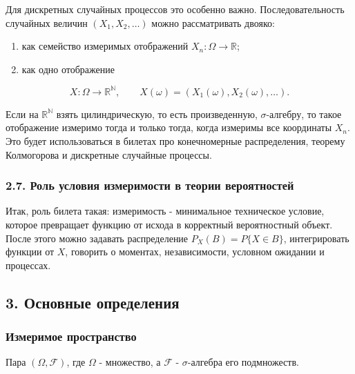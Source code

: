 \documentclass[
  11pt,
  a4paper,
]{article}
\providecommand{\tightlist}{%
  \setlength{\itemsep}{0pt}\setlength{\parskip}{0pt}}
\begin{document}
Для дискретных случайных процессов это особенно важно.
Последовательность случайных величин \((X_1,X_2,\ldots)\) можно
рассматривать двояко:

\begin{enumerate}
\def\labelenumi{\arabic{enumi}.}
\tightlist
\item
  как семейство измеримых отображений \(X_n:\Omega\to\mathbb R\);
\item
  как одно отображение
\end{enumerate}

\[
X:\Omega\to\mathbb R^{\mathbb N},\qquad
X(\omega)=(X_1(\omega),X_2(\omega),\ldots).
\]

Если на \(\mathbb R^{\mathbb N}\) взять цилиндрическую, то есть
произведенную, \(\sigma\)-алгебру, то такое отображение измеримо тогда и
только тогда, когда измеримы все координаты \(X_n\). Это будет
использоваться в билетах про конечномерные распределения, теорему
Колмогорова и дискретные случайные процессы.

\subsubsection{2.7. Роль условия измеримости в теории
вероятностей}\label{ux440ux43eux43bux44c-ux443ux441ux43bux43eux432ux438ux44f-ux438ux437ux43cux435ux440ux438ux43cux43eux441ux442ux438-ux432-ux442ux435ux43eux440ux438ux438-ux432ux435ux440ux43eux44fux442ux43dux43eux441ux442ux435ux439}

Итак, роль билета такая: измеримость - минимальное техническое условие,
которое превращает функцию от исхода в корректный вероятностный объект.
После этого можно задавать распределение \(P_X(B)=P\{X\in B\}\),
интегрировать функции от \(X\), говорить о моментах, независимости,
условном ожидании и процессах.

\subsection{3. Основные
определения}\label{ux43eux441ux43dux43eux432ux43dux44bux435-ux43eux43fux440ux435ux434ux435ux43bux435ux43dux438ux44f}

\subsubsection{Измеримое
пространство}\label{ux438ux437ux43cux435ux440ux438ux43cux43eux435-ux43fux440ux43eux441ux442ux440ux430ux43dux441ux442ux432ux43e}

Пара \((\Omega,\mathcal F)\), где \(\Omega\) - множество, а
\(\mathcal F\) - \(\sigma\)-алгебра его подмножеств.
\end{document}
